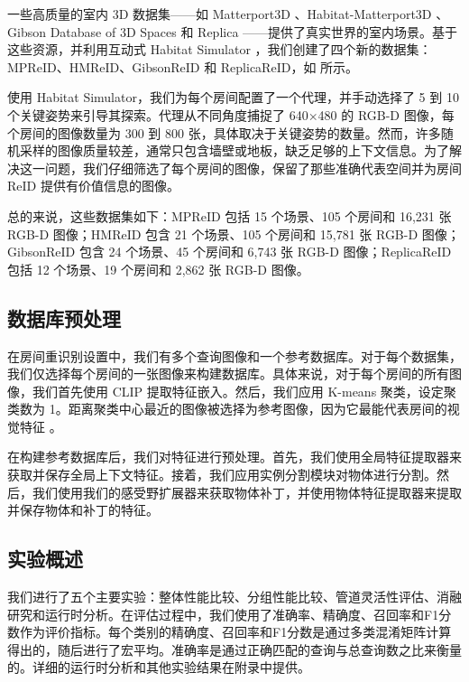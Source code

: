 一些高质量的室内 3D 数据集——如 Matterport3D \cite{Matterport3D}、Habitat-Matterport3D \cite{ramakrishnan2021hm3d}、Gibson Database of 3D Spaces \cite{xiazamirhe2018gibsonenv} 和 Replica \cite{replica19arxiv}——提供了真实世界的室内场景。基于这些资源，并利用互动式 Habitat Simulator \cite{puig2023habitat3, szot2021habitat, habitat19iccv}，我们创建了四个新的数据集：MPReID、HMReID、GibsonReID 和 ReplicaReID，如  所示。

使用 Habitat Simulator，我们为每个房间配置了一个代理，并手动选择了 5 到 10 个关键姿势来引导其探索。代理从不同角度捕捉了 640×480 的 RGB-D 图像，每个房间的图像数量为 300 到 800 张，具体取决于关键姿势的数量。然而，许多随机采样的图像质量较差，通常只包含墙壁或地板，缺乏足够的上下文信息。为了解决这一问题，我们仔细筛选了每个房间的图像，保留了那些准确代表空间并为房间 ReID 提供有价值信息的图像。

总的来说，这些数据集如下：MPReID 包括 15 个场景、105 个房间和 16,231 张 RGB-D 图像；HMReID 包含 21 个场景、105 个房间和 15,781 张 RGB-D 图像；GibsonReID 包含 24 个场景、45 个房间和 6,743 张 RGB-D 图像；ReplicaReID 包括 12 个场景、19 个房间和 2,862 张 RGB-D 图像。

\vspace{-4pt}
\subsection{数据库预处理}
\vspace{-4pt}

在房间重识别设置中，我们有多个查询图像和一个参考数据库。对于每个数据集，我们仅选择每个房间的一张图像来构建数据库。具体来说，对于每个房间的所有图像，我们首先使用 CLIP \cite{radford2021learningtransferablevisualmodels} 提取特征嵌入。然后，我们应用 K-means 聚类，设定聚类数为 1。距离聚类中心最近的图像被选择为参考图像，因为它最能代表房间的视觉特征 \cite{tan2005introduction}。

在构建参考数据库后，我们对特征进行预处理。首先，我们使用全局特征提取器来获取并保存全局上下文特征。接着，我们应用实例分割模块对物体进行分割。然后，我们使用我们的感受野扩展器来获取物体补丁，并使用物体特征提取器来提取并保存物体和补丁的特征。

\vspace{-4pt}
\subsection{实验概述}
\vspace{-4pt}
我们进行了五个主要实验：整体性能比较、分组性能比较、管道灵活性评估、消融研究和运行时分析。在评估过程中，我们使用了准确率、精确度、召回率和F1分数作为评价指标。每个类别的精确度、召回率和F1分数是通过多类混淆矩阵计算得出的，随后进行了宏平均。准确率是通过正确匹配的查询与总查询数之比来衡量的。详细的运行时分析和其他实验结果在附录中提供。


